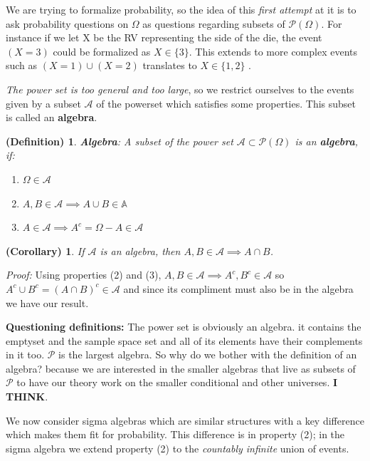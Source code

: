 \documentclass{article}
\newtheorem{definition}{(Definition)}
\newtheorem{corollary}{(Corollary)}
\begin{document}
We are trying to formalize probability, so the idea of this \textit{first attempt} at it is to ask probability questions on $\Omega$ as questions regarding subsets of $\mathcal{P}(\Omega)$. For instance if we let X be the RV representing the side of the die, the event $(X=3)$ could be formalized as $X \in \{3\}$. This extends to more complex events such as $(X=1)\cup (X=2)$ translates to $X \in \{1,2\}$ .



 \textit{The power set is too general and too large}, so we restrict ourselves to the events given by a subset $\mathcal{A}$ of the powerset which satisfies some properties. This subset is called an \textbf{algebra}.
 
 \begin{definition}
 \textbf{Algebra}: A subset of the power set $\mathcal{A} \subset \mathcal{P}(\Omega)$ is an \textbf{algebra}, if: 
 \end{definition}
 \begin{enumerate}
 \item $\Omega \in \mathcal{A}$
 \item $A, B \in \mathcal{A} \implies A \cup B \in \mathbb{A}$
 \item $A \in \mathcal{A} \implies A^c = \Omega - A \in \mathcal{A}$
 \end{enumerate}
 
 \begin{corollary}
 If $\mathcal{A}$ is an algebra, then $A, B \in \mathcal{A} \implies A \cap B$.
 \end{corollary}
 \textit{Proof:} Using properties (2) and (3), $A,B \in \mathcal{A} \implies A^c, B^c \in \mathcal{A}$ so $A^c \cup B^c = (A \cap B)^c \in \mathcal{A}$ and since its compliment must also be in the algebra we have our result. 

\textbf{Questioning definitions:}
The power set is obviously an algebra. it contains the emptyset and the sample space set and all of its elements have their complements in it too. $\mathcal{P}$ is the largest algebra. So why do we bother with the definition of an algebra? because we are interested in the smaller algebras that live as subsets of $\mathcal{P}$ to have our theory work on the smaller conditional and other universes. \textbf{I THINK}. 

We now consider sigma algebras which are similar structures with a key difference which makes them fit for probability. This difference is in property (2); in the sigma algebra we extend property (2) to  the \textit{countably infinite} union of events.
\end{document}
